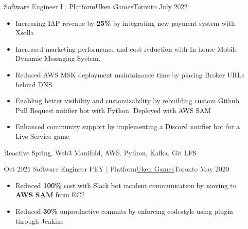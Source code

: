 %
%
%
\begin{experiences}
  \experienceCurrent
    {Software Engineer I | Platform}{\href{https://uken.com}{Uken Games}}{Toronto}
    {July 2022} {
                    \begin{itemize}
                        \setlength\itemsep{0.2em}
                        \item Increasing IAP revenue by \textbf{25\%} by integrating new payment system with Xsolla 

                        \item Increased marketing performance and cost reduction with In-house Mobile Dynamic Messaging System.
                        
                        \item Reduced AWS MSK deployment maintainance time by placing Broker URLs behind DNS

                        \item Enabling better visibility and customizability by rebuilding custom Github Pull Request notifier bot with Python. Deployed with AWS SAM

                        \item Enhanced community support by implementing a Discord notifier bot for a Live Service game
                    \end{itemize}
                    }
                    {Reactive Spring, Web3 Manifold, AWS, Python, Kafka, Git LFS}

  \emptySeparator
  \experience
    {Oct 2021}   {Software Engineer PEY | Platform}{\href{https://uken.com}{Uken Games}}{Toronto}
    {May 2020} {
                    \begin{itemize}
                        \setlength\itemsep{0.2em}
                        \item Reduced \textbf{100\%} cost with Slack bot incident communication by moving to \textbf{AWS SAM} from EC2
                        
                        \item Reduced \textbf{30\%} unproductive commits by enforcing codestyle using  plugin through Jenkins
                        

\end{itemize}}
\end{experiences}
